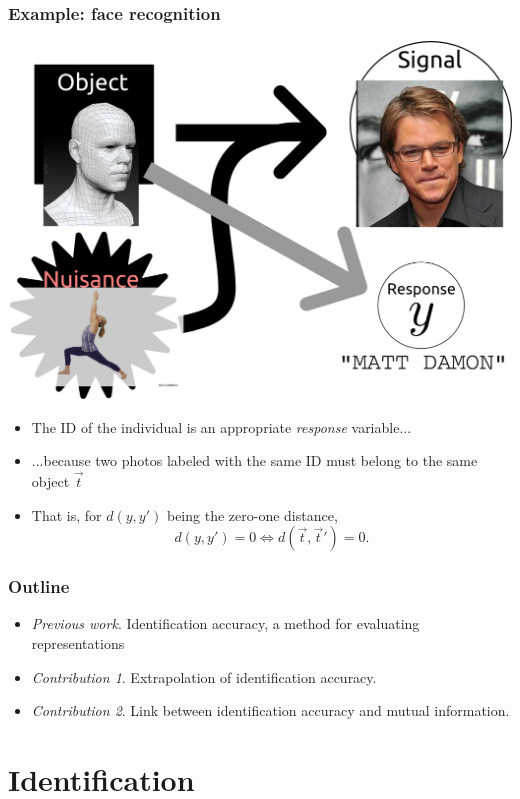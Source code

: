 \documentclass{beamer}
\begin{document}
\begin{frame}
\frametitle{Example: face recognition}
\begin{center}
\includegraphics[scale = 0.15]{defense_diagrams/face_3.png}
\end{center}
\begin{itemize}
\item The ID of the individual is an appropriate \emph{response} variable...\pause
\item ...because two photos labeled with the same ID must belong to the same object $\vec{t}$ \pause
\item That is, for $d(y, y')$ being the zero-one distance,
\[
d(y, y') = 0 \Leftrightarrow d(\vec{t}, \vec{t}') = 0.
\]
\end{itemize}

\end{frame}

\begin{frame}
\frametitle{Outline}
\begin{itemize}
\item \emph{Previous work}. Identification accuracy, a method for evaluating representations
\item \emph{Contribution 1}.  Extrapolation of identification accuracy. 
\item \emph{Contribution 2}.  Link between identification accuracy and mutual information.
\end{itemize}
\end{frame}

\section{Identification}
\end{document}
